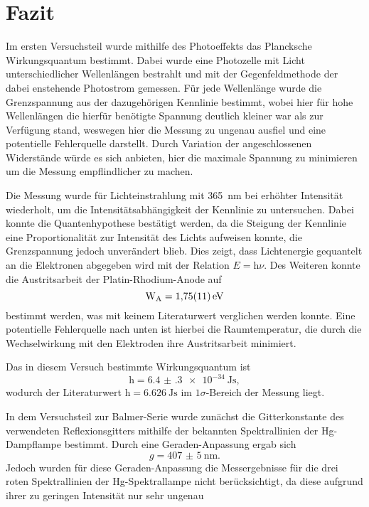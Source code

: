 \section{Fazit}\label{sec:fazit}
Im ersten Versuchsteil wurde mithilfe des Photoeffekts das Plancksche Wirkungsquantum
bestimmt. Dabei wurde eine Photozelle mit Licht unterschiedlicher Wellenlängen 
bestrahlt und mit der Gegenfeldmethode der dabei enstehende Photostrom gemessen.
Für jede Wellenlänge wurde die Grenzspannung aus der dazugehörigen 
Kennlinie bestimmt, wobei hier für hohe Wellenlängen die hierfür benötigte
Spannung deutlich kleiner war als zur Verfügung stand, weswegen hier
die Messung zu ungenau ausfiel und eine potentielle Fehlerquelle darstellt.
Durch Variation der angeschlossenen Widerstände würde es sich anbieten, 
hier die maximale Spannung zu minimieren um die Messung empflindlicher 
zu machen.\par
Die Messung wurde für Lichteinstrahlung mit \SI{365}{\nano\meter} bei erhöhter
Intensität wiederholt, um die Intensitätsabhängigkeit der
Kennlinie zu untersuchen. Dabei konnte die Quantenhypothese bestätigt werden, 
da die Steigung der Kennlinie eine Proportionalität zur Intensität
des Lichts aufweisen konnte, die Grenzspannung jedoch unverändert blieb. 
Dies zeigt, dass Lichtenergie gequantelt an die Elektronen abgegeben wird 
mit der Relation $E=\mathrm h\nu$.
Des Weiteren konnte die Austritsarbeit der Platin-Rhodium-Anode auf 
\[\mathrm W_{\mathrm A} = \SI{1.75\pm0.11}{\electronvolt}\]
bestimmt werden, was mit keinem Literaturwert verglichen werden konnte. 
Eine potentielle Fehlerquelle nach unten ist hierbei die Raumtemperatur, die 
durch die Wechselwirkung mit den Elektroden ihre Austritsarbeit minimiert.\par
Das in diesem Versuch bestimmte Wirkungsquantum ist 
\[\mathrm h = \SI{6.4(3)e-34}{\joule\second} ,\]
wodurch der Literaturwert $\mathrm h = \SI{6.626}{\joule\second}$ im $1\sigma$-Bereich der Messung liegt.
\\ \par
In dem Versuchsteil zur Balmer-Serie wurde zunächst die Gitterkonstante des verwendeten Reflexionsgitters
mithilfe der bekannten Spektrallinien der Hg-Dampflampe bestimmt. Durch eine Geraden-Anpassung
ergab sich
\begin{equation*}
    g = \SI{407(5)}{\nano \meter} .
\end{equation*} Jedoch wurden für diese Geraden-Anpassung die Messergebnisse für die drei roten
Spektrallinien der Hg-Spektrallampe nicht berücksichtigt, da diese aufgrund ihrer zu geringen Intensität nur sehr ungenau

